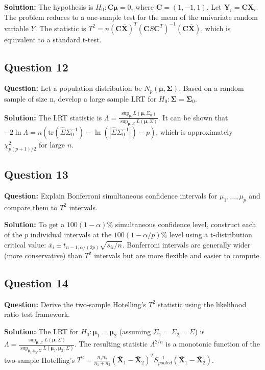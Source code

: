 \textbf{Solution:}
The hypothesis is $H_0: \mathbf{C}\boldsymbol{\mu} = 0$, where $\mathbf{C} = (1, -1, 1)$. Let $\mathbf{Y}_i = \mathbf{C}\mathbf{X}_i$. The problem reduces to a one-sample test for the mean of the univariate random variable $Y$. The statistic is $T^2 = n(\mathbf{C}\bar{\mathbf{X}})^T(\mathbf{C}S\mathbf{C}^T)^{-1}(\mathbf{C}\bar{\mathbf{X}})$, which is equivalent to a standard t-test.

\subsection*{Question 12}
\textbf{Question:} Let a population distribution be $N_p(\boldsymbol{\mu}, \boldsymbol{\Sigma})$. Based on a random sample of size n, develop a large sample LRT for $H_0: \boldsymbol{\Sigma} = \boldsymbol{\Sigma}_0$.

\textbf{Solution:}
The LRT statistic is $\Lambda = \frac{\sup_{\boldsymbol{\mu}} L(\boldsymbol{\mu}, \Sigma_0)}{\sup_{\boldsymbol{\mu}, \Sigma} L(\boldsymbol{\mu}, \Sigma)}$. It can be shown that $-2\ln\Lambda = n(\text{tr}(\hat{\Sigma}\Sigma_0^{-1}) - \ln(|\hat{\Sigma}\Sigma_0^{-1}|) - p)$, which is approximately $\chi^2_{p(p+1)/2}$ for large $n$.

\subsection*{Question 13}
\textbf{Question:} Explain Bonferroni simultaneous confidence intervals for $\mu_1, \dots, \mu_p$ and compare them to $T^2$ intervals.

\textbf{Solution:}
To get a $100(1-\alpha)\%$ simultaneous confidence level, construct each of the $p$ individual intervals at the $100(1-\alpha/p)\%$ level using a t-distribution critical value: $\bar{x}_i \pm t_{n-1, \alpha/(2p)} \sqrt{s_{ii}/n}$. Bonferroni intervals are generally wider (more conservative) than $T^2$ intervals but are more flexible and easier to compute.

\subsection*{Question 14}
\textbf{Question:} Derive the two-sample Hotelling's $T^2$ statistic using the likelihood ratio test framework.

\textbf{Solution:}
The LRT for $H_0: \boldsymbol{\mu}_1 = \boldsymbol{\mu}_2$ (assuming $\Sigma_1=\Sigma_2=\Sigma$) is $\Lambda = \frac{\sup_{\boldsymbol{\mu}, \Sigma} L(\boldsymbol{\mu}, \Sigma)}{\sup_{\boldsymbol{\mu}_1, \boldsymbol{\mu}_2, \Sigma} L(\boldsymbol{\mu}_1, \boldsymbol{\mu}_2, \Sigma)}$. The resulting statistic $\Lambda^{2/n}$ is a monotonic function of the two-sample Hotelling's $T^2 = \frac{n_1 n_2}{n_1+n_2}(\bar{\mathbf{X}}_1 - \bar{\mathbf{X}}_2)^T S_{pooled}^{-1} (\bar{\mathbf{X}}_1 - \bar{\mathbf{X}}_2)$.

